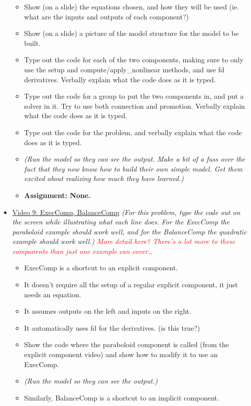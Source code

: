 \documentclass[12pt, letterpaper]{article}
\begin{document}
\begin{itemize}
\begin{itemize}
			\item Show (on a slide) the equations chosen, and how they will be used (ie. what are the inputs and outputs of each component?)
			\item Show (on a slide) a picture of the model structure for the model to be built.
			\item Type out the code for each of the two components, making sure to only use the setup and compute/apply\_nonlinear methods, and use fd derivatives. Verbally explain what the code does as it is typed.
			\item Type out the code for a group to put the two components in, and put a solver in it. Try to use both connection and promotion. Verbally explain what the code does as it is typed.
			\item Type out the code for the problem, and verbally explain what the code does as it is typed.
			\item \textit{(Run the model so they can see the output. Make a bit of a fuss over the fact that they now know how to build their own simple model. Get them excited about realizing how much they have learned.)}
			\item \textbf{Assignment: None.}
		\end{itemize}
	\item \underline{Video 9: ExecComp, BalanceComp} \textit{(For this problem, type the code out on the screen while illustrating what each line does. For the ExecComp the paraboloid example should work well, and for the BalanceComp the quadratic example should work well.) \textcolor{red}{More detail here? There’s a lot more to these components than just one example can cover…}}
		\begin{itemize}
			\item ExecComp is a shortcut to an explicit component. 
			\item It doesn’t require all the setup of a regular explicit component, it just needs an equation.
			\item It assumes outputs on the left and inputs on the right. 
			\item It automatically uses fd for the derivatives. (is this true?)
			\item Show the code where the paraboloid component is called (from the explicit component video) and show how to modify it to use an ExecComp.
			\item \textit{(Run the model so they can see the output.)}
			\item Similarly, BalanceComp is a shortcut to an implicit component.

\end{itemize}
\end{itemize}
\end{document}
